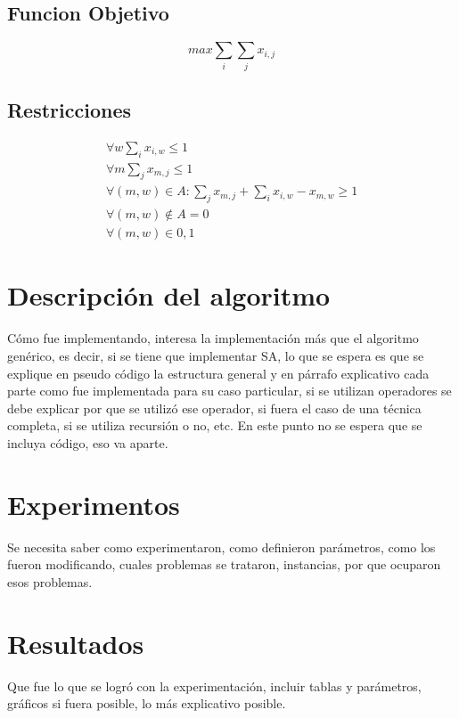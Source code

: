 \documentclass[letter, 10pt]{article}
\begin{document}
\subsection{Funcion Objetivo}
\begin{equation*}
max \underset{i}{\sum} \underset{j}{\sum} x_{i,j}
\end{equation*}

\subsection{Restricciones}
\begin{align*}
\forall w \underset{i}{\sum} x_{i,w} \leq 1 \\
\forall m \underset{j}{\sum} x_{m,j} \leq 1 \\
\forall(m,w) \in A: \underset{j}{\sum} x_{m,j} + \underset{i}{\sum} x_{i,w} - x_{m,w} \geq 1 \\
\forall (m,w) \notin A = 0 \\
\forall (m,w) \in {0,1}
\end{align*}


\section{Descripci\'on del algoritmo}
C\'omo fue implementando, interesa la implementaci\'on m\'as que el algoritmo gen\'erico, es decir,
si se tiene que implementar SA, lo que se espera es que se explique en pseudo c\'odigo la estructura
general y en p\'arrafo explicativo cada parte como fue implementada para su caso particular, si
se utilizan operadores se debe explicar por que se utiliz\'o ese operador, si fuera el caso de una
t\'ecnica completa, si se utiliza recursi\'on o no, etc. En este punto no se espera que se incluya
c\'odigo, eso va aparte.

\section{Experimentos}
Se necesita saber como experimentaron, como definieron par\'ametros, como los fueron modificando, cuales 
problemas se trataron, instancias, por que ocuparon esos problemas.

\section{Resultados}
Que fue lo que se logr\'o con la experimentaci\'on, incluir tablas y par\'ametros, gr\'aficos si fuera
posible, lo m\'as explicativo posible.
\end{document}
